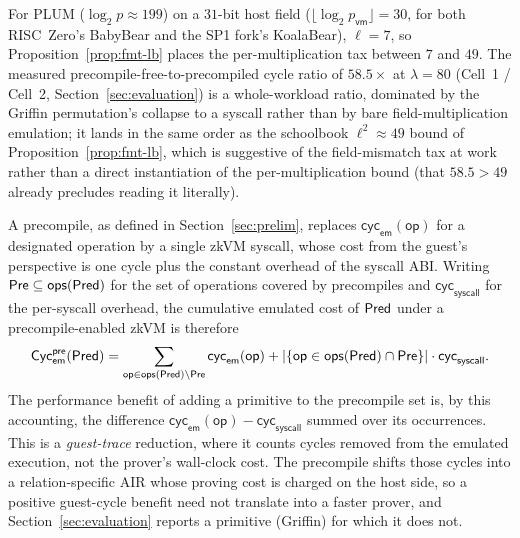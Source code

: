 \begin{remark}\label{rem:fmt-instantiation}
    For PLUM ($\log_2 p\approx 199$) on a $31$-bit host field ($\lfloor\log_2 p_{\mathsf{vm}}\rfloor = 30$, for both RISC~Zero's BabyBear and the SP1 fork's KoalaBear), $\ell = 7$, so Proposition~\ref{prop:fmt-lb} places the per-multiplication tax between $7$ and $49$. The measured precompile-free-to-precompiled cycle ratio of $58.5\times$ at $\lambda=80$ (Cell~1 / Cell~2, Section~\ref{sec:evaluation}) is a whole-workload ratio, dominated by the Griffin permutation's collapse to a syscall rather than by bare field-multiplication emulation; it lands in the same order as the schoolbook $\ell^2\approx 49$ bound of Proposition~\ref{prop:fmt-lb}, which is suggestive of the field-mismatch tax at work rather than a direct instantiation of the per-multiplication bound (that $58.5 > 49$ already precludes reading it literally).
\end{remark}

A precompile, as defined in Section~\ref{sec:prelim}, replaces $\mathsf{cyc}_{\mathsf{em}}(\mathsf{op})$ for a designated operation by a single zkVM syscall, whose cost from the guest's perspective is one cycle plus the constant overhead of the syscall ABI. Writing $\mathsf{Pre}\subseteq\mathsf{ops}(\mathsf{Pred})$ for the set of operations covered by precompiles and $\mathsf{cyc}_{\mathsf{syscall}}$ for the per-syscall overhead, the cumulative emulated cost of $\mathsf{Pred}$ under a precompile-enabled zkVM is therefore
\begin{equation*}
  \mathsf{Cyc}_{\mathsf{em}}^{\mathsf{pre}}(\mathsf{Pred})
  =
  \sum_{\mathsf{op}\in\mathsf{ops}(\mathsf{Pred})\setminus\mathsf{Pre}}
  \mathsf{cyc}_{\mathsf{em}}(\mathsf{op})
  + |\{\mathsf{op}\in\mathsf{ops}(\mathsf{Pred})\cap\mathsf{Pre}\}|
  \cdot \mathsf{cyc}_{\mathsf{syscall}}.
\end{equation*} The performance benefit of adding a primitive to the precompile set is, by this accounting, the difference $\mathsf{cyc}_{\mathsf{em}}(\mathsf{op}) - \mathsf{cyc}_{\mathsf{syscall}}$ summed over its occurrences. This is a \emph{guest-trace} reduction, where it counts cycles removed from the emulated execution, not the prover's wall-clock cost. The precompile shifts those cycles into a relation-specific AIR whose proving cost is charged on the host side, so a positive guest-cycle benefit need not translate into a faster prover, and Section~\ref{sec:evaluation} reports a primitive (Griffin) for which it does not.

